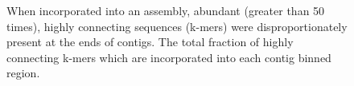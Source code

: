 \documentclass[10pt]{article}
\begin{document}
\begin{figure}
\caption{When incorporated into an assembly, abundant (greater than 50 times), highly connecting sequences (k-mers) were disproportionately present at the ends of contigs.  The total fraction of highly connecting k-mers which are incorporated into each contig binned region.}
\end{figure}
\end{document}
